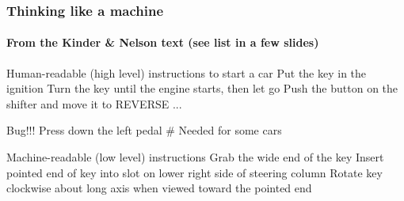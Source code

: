 \documentclass[hyperref={colorlinks=true}]{beamer}
\begin{document}
\begin{frame}[fragile]
  \frametitle{Thinking like a machine}
  \framesubtitle{From the Kinder \& Nelson text (see list in a few slides)}
    
    
  \pause
  
  \begin{ucpythonblock}{Human-readable (high level) instructions to start a car}
    Put the key in the ignition
    Turn the key until the engine starts, 
        then let go
    Push the button on the shifter and move it 
        to REVERSE
    ...
  \end{ucpythonblock}

  \pause

  \begin{ucpythonblock}{Bug!!!}
    Press down the left pedal # Needed for some cars
  \end{ucpythonblock}
  
  \pause

  \begin{ucpythonblock}{Machine-readable (low level) instructions}
    Grab the wide end of the key
    Insert pointed end of key into slot on lower 
        right side of steering column
    Rotate key clockwise about long axis when viewed 
        toward the pointed end
  \end{ucpythonblock}
  
  
\end{frame}

\end{document}
